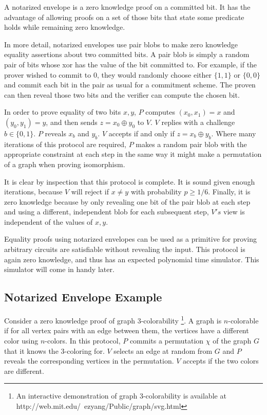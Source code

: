 \documentclass{article}
\begin{document}
A notarized envelope is a zero knowledge proof on a committed bit. It
has the advantage of allowing proofs on a set of those bits that state
some predicate holds while remaining zero knowledge.

In more detail, notarized envelopes use pair blobs to make zero
knowledge equality assertions about two committed bits. A pair blob is
simply a random pair of bits whose xor has the value of the bit
committed to. For example, if the prover wished to commit to 0, they
would randomly choose either $\{1, 1\}$ or $\{0, 0\}$ and commit each bit
in the pair as usual for a commitment scheme. The proven can then reveal
those two bits and the verifier can compute the chosen bit.

In order to prove equality of two bits $x, y$, $P$ computes
$(x_0,x_1) = x$ and $(y_0, y_1) = y$, and then sends $z = x_0 \oplus y_0$
to $V$. $V$ replies with a challenge $b \in \{0,1\}$. $P$ reveals $x_b$
and $y_b$. $V$ accepts if and only if $z = x_b \oplus y_b$.
Where many iterations of this protocol are required, $P$
makes a random pair blob with the appropriate constraint at each step
in the same way it might make a permutation of a graph when proving
isomorphism.

It is clear by inspection that this protocol is complete. It is sound
given enough iterations, because $V$
will reject if $x \neq y$
with probability $p \ge 1/6$.
Finally, it is zero knowledge because by only revealing one bit of the
pair blob at each step and using a different, independent blob for
each subsequent step, $V's$
view is independent of the values of $x, y$.

Equality proofs using notarized envelopes can be used as a primitive
for proving arbitrary circuits are satisfiable without revealing the
input. This protocol is again zero knowledge, and thus has an expected
polynomial time simulator. This simulator will come in handy later.

\subsection{Notarized Envelope Example}

Consider a zero knowledge proof of graph 3-colorability \footnote{An
  interactive demonstration of graph 3-colorability is available at
  http://web.mit.edu/~ezyang/Public/graph/svg.html}. A graph is
$n$-colorable
if for all vertex pairs with an edge between them, the vertices have a
different color using $n$-colors.
In this protocol, $P$
commits a permutation $\chi$
of the graph $G$
that it knows the 3-coloring for. $V$
selects an edge at random from $G$
and $P$
reveals the corresponding vertices in the permutation. $V$
accepts if the two colors are different.
\end{document}
